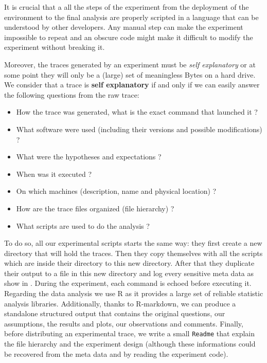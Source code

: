 It is crucial that a all the steps of the experiment from the deployment of the environment to the final analysis are properly scripted in a language that can be understood by other developers.
Any manual step can make the experiment impossible to repeat and an obscure code might make it difficult to modify the experiment without breaking it.

Moreover, the traces generated by an experiment must be \emph{self explanatory} or at some point they will only be a (large) set of meaningless Bytes on a hard drive.
We consider that a trace is \textbf{self explanatory} if and only if we can easily answer the following questions from the raw trace:
\begin{itemize}
    \item How the trace was generated, what is the exact command that launched it ?
    \item What software were used (including their versions and possible modifications) ?
    \item What were the hypotheses and expectations ?
    \item When was it executed ?
    \item On which machines (description, name and physical location) ?
    \item How are the trace files organized (file hierarchy) ?
    \item What scripts are used to do the analysis ?
\end{itemize}
To do so, all our experimental scripts starts the same way: they first create a new directory that will hold the traces.
Then they copy themselves with all the scripts which are inside their directory to this new directory.
After that they duplicate their output to a file in this new directory and log every sensitive meta data as show in .
During the experiment, each command is echoed before executing it.
Regarding the data analysis we use \gls{R} as it provides a large set of reliable statistic analysis libraries.
Additionally, thanks to \gls{R-markdown}, we can produce a standalone structured output that contains the original questions, our assumptions, the results and plots, our observations and comments.
Finally, before distributing an experimental trace, we write a small \texttt{Readme} that explain the file hierarchy and the experiment design (although these informations could be recovered from the meta data and by reading the experiment code).



